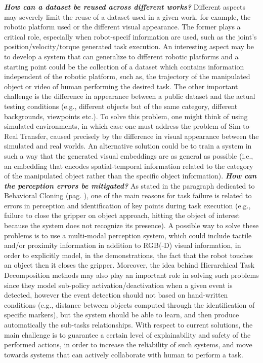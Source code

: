 \newline \textbf{\textit{How can a dataset be reused across different works?}} Different aspects may severely limit the reuse of a dataset used in a given work, for example, the robotic platform used or the different visual appearance. The former plays a critical role, especially when robot-specif information are used, such as the joint's position/velocity/torque generated task execution. An interesting aspect may be to develop a system that can generalize to different robotic platforms and a starting point could be the collection of a dataset which contains information independent of the robotic platform, such as, the trajectory of the manipulated object or video of human performing the desired task. The other important challenge is the difference in appearance between a public dataset and the actual testing conditions (e.g., different objects but of the same category, different backgrounds, viewpoints etc.). To solve this problem, one might think of using simulated environments, in which case one must address the problem of Sim-to-Real Transfer, caused precisely by the difference in visual appearance between the simulated and real worlds. 
An alternative solution could be to train a system in such a way that the generated visual embeddings are as general as possible (i.e., an embedding that encodes spatial-temporal information related to the category of the manipulated object rather than the specific object information).
\newline \textbf{\textit{How can the perception errors be mitigated?}} As stated in the paragraph dedicated to Behavioral Cloning (pag. \pageref{sec:lfo}), one of the main reasons for task failure is related to errors in perception and identification of key points during task execution (e.g., failure to close the gripper on object approach, hitting the object of interest because the system does not recognize its presence). A possible way to solve these problems is to use a multi-modal perception system, which could include tactile and/or proximity information in addition to RGB(-D) visual information, in order to explicitly model, in the demonstrations, the fact that the robot touches an object then it closes the gripper. Moreover, the idea behind Hierarchical Task Decomposition methods may also play an important role in solving such problems since they model sub-policy activation/deactivation when a given event is detected, however the event detection should not based on hand-written conditions (e.g., distance between objects computed through the identification of specific markers), but the system should be able to learn, and then produce automatically the sub-tasks relationships. With respect to current solutions, the main challenge is to guarantee a certain level of explainability and safety of the performed actions, in order to increase the reliability of such systems, and move towards systems that can actively collaborate with human to perform a task.
